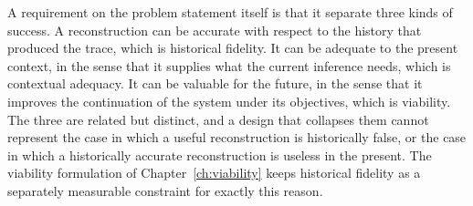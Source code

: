 A requirement on the problem statement itself is that it separate three kinds of success. A reconstruction can be accurate with respect to the history that produced the trace, which is historical fidelity. It can be adequate to the present context, in the sense that it supplies what the current inference needs, which is contextual adequacy. It can be valuable for the future, in the sense that it improves the continuation of the system under its objectives, which is viability. The three are related but distinct, and a design that collapses them cannot represent the case in which a useful reconstruction is historically false, or the case in which a historically accurate reconstruction is useless in the present. The viability formulation of Chapter~\ref{ch:viability} keeps historical fidelity as a separately measurable constraint for exactly this reason.
